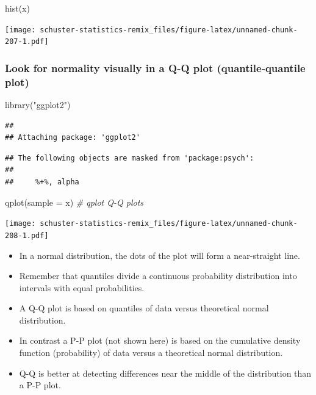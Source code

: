 \documentclass[
]{book}
\newenvironment{Shaded}{\begin{snugshade}}{\end{snugshade}}
\newcommand{\AttributeTok}[1]{\textcolor[rgb]{0.77,0.63,0.00}{#1}}
\newcommand{\CommentTok}[1]{\textcolor[rgb]{0.56,0.35,0.01}{\textit{#1}}}
\newcommand{\FunctionTok}[1]{\textcolor[rgb]{0.00,0.00,0.00}{#1}}
\newcommand{\NormalTok}[1]{#1}
\newcommand{\StringTok}[1]{\textcolor[rgb]{0.31,0.60,0.02}{#1}}
\begin{document}
\begin{Shaded}
\begin{Highlighting}[]
\FunctionTok{hist}\NormalTok{(x)}
\end{Highlighting}
\end{Shaded}

\texttt{[image: schuster-statistics-remix\_files/figure-latex/unnamed-chunk-207-1.pdf]}

\hypertarget{look-for-normality-visually-in-a-q-q-plot-quantile-quantile-plot}{%
\subsubsection{Look for normality visually in a Q-Q plot (quantile-quantile plot)}\label{look-for-normality-visually-in-a-q-q-plot-quantile-quantile-plot}}

\begin{Shaded}
\begin{Highlighting}[]
\FunctionTok{library}\NormalTok{(}\StringTok{"ggplot2"}\NormalTok{)}
\end{Highlighting}
\end{Shaded}

\begin{verbatim}
## 
## Attaching package: 'ggplot2'
\end{verbatim}

\begin{verbatim}
## The following objects are masked from 'package:psych':
## 
##     %+%, alpha
\end{verbatim}

\begin{Shaded}
\begin{Highlighting}[]
\FunctionTok{qplot}\NormalTok{(}\AttributeTok{sample =}\NormalTok{ x) }\CommentTok{\# qplot Q{-}Q plots}
\end{Highlighting}
\end{Shaded}

\texttt{[image: schuster-statistics-remix\_files/figure-latex/unnamed-chunk-208-1.pdf]}

\begin{itemize}
\item
  In a normal distribution, the dots of the plot will form a near-straight line.
\item
  Remember that quantiles divide a continuous probability distribution into intervals with equal probabilities.
\item
  A Q-Q plot is based on quantiles of data versus theoretical normal distribution.
\item
  In contrast a P-P plot (not shown here) is based on the cumulative density function (probability) of data versus a theoretical normal distribution.
\item
  Q-Q is better at detecting differences near the middle of the distribution than a P-P plot.
\end{itemize}
\end{document}
